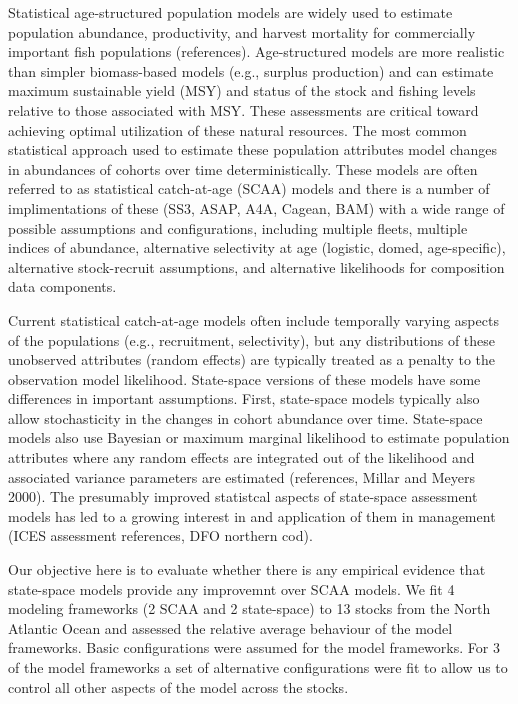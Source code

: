 \documentclass[12pt,letterpaper, leqno]{article}
\begin{document}
Statistical age-structured population models are widely used to estimate population abundance, productivity, and harvest mortality for commercially important fish populations (references). Age-structured models are more realistic than simpler biomass-based models (e.g., surplus production) and can estimate maximum sustainable yield (MSY) and status of the stock and fishing levels relative to those associated with MSY. These assessments are critical toward achieving optimal utilization of these natural resources. The most common statistical approach used to estimate these population attributes model changes in abundances of cohorts over time deterministically. These models are often referred to as statistical catch-at-age (SCAA) models and there is a number of implimentations of these (SS3, ASAP, A4A, Cagean, BAM) with a wide range of possible assumptions and configurations, including multiple fleets, multiple indices of abundance, alternative selectivity at age (logistic, domed, age-specific), alternative stock-recruit assumptions, and alternative likelihoods for composition data components. 

Current statistical catch-at-age models often include temporally varying aspects of the populations (e.g., recruitment, selectivity), but any distributions of these unobserved attributes (random effects) are typically treated as a penalty to the observation model likelihood. State-space versions of these models have some differences in important assumptions. First, state-space models typically also allow stochasticity in the changes in cohort abundance over time. State-space models also use Bayesian or maximum marginal likelihood to estimate population attributes where any random effects are integrated out of the likelihood and associated variance parameters are estimated (references, Millar and Meyers 2000). The presumably improved statistcal aspects of state-space assessment models has led to a growing interest in and application of them in management (ICES assessment references, DFO northern cod).

Our objective here is to evaluate whether there is any empirical evidence that state-space models provide any improvemnt over SCAA models. We fit 4 modeling frameworks (2 SCAA and 2 state-space) to 13 stocks from the North Atlantic Ocean and assessed the relative average behaviour of the model frameworks. Basic configurations were assumed for the model frameworks. For 3 of the model frameworks a set of alternative configurations were fit to allow us to control all other aspects of the model across the stocks.
\end{document}
